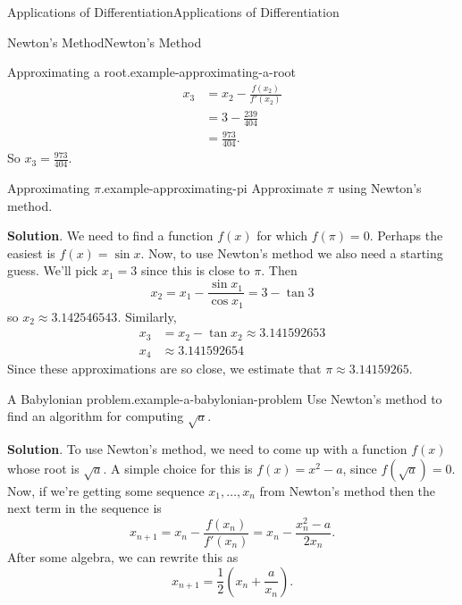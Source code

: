 \documentclass[10pt,]{book}
\numberwithin{equation}{section}
\begin{document}
\begin{chapterptx}{Applications of Differentiation}{}{Applications of Differentiation}{}{}
\begin{sectionptx}{Newton's Method}{}{Newton's Method}{}{}
\begin{example}{Approximating a root.}{example-approximating-a-root}
\begin{align*}
x_{3} & = x_{2} - \frac{f(x_{2})}{f'(x_{2})} \\
& = 3 - \frac{239}{404} \\
& = \frac{973}{404}. 
\end{align*}
So \(x_{3} = \frac{973}{404}.\)%
\end{example}
\begin{example}{Approximating \(\pi\).}{example-approximating-pi}%
\hypertarget{p-371}{}%
Approximate \(\pi\) using Newton's method.%
\par\smallskip%
\noindent\textbf{Solution}.\hypertarget{solution-82}{}\quad%
\hypertarget{p-372}{}%
We need to find a function \(f(x)\) for which \(f(\pi) = 0\). Perhaps the easiest is \(f(x) = \sin x\). Now, to use Newton's method we also need a starting guess. We'll pick \(x_{1} = 3\) since this is close to \(\pi\). Then%
\begin{equation*}
x_{2} = x_{1} - \frac{\sin x_{1}}{\cos x_{1}} = 3 - \tan 3
\end{equation*}
so \(x_{2} \approx 3.142546543\). Similarly,%
\begin{align*}
x_{3} & = x_{2} - \tan x_{2} \approx 3.141592653 \\
x_{4} & \approx 3.141592654 
\end{align*}
Since these approximations are so close, we estimate that \(\pi\approx 3.14159265\).%
\end{example}
\begin{example}{A Babylonian problem.}{example-a-babylonian-problem}%
\hypertarget{p-373}{}%
Use Newton's method to find an algorithm for computing \(\sqrt{a}\).%
\par\smallskip%
\noindent\textbf{Solution}.\hypertarget{solution-83}{}\quad%
\hypertarget{p-374}{}%
To use Newton's method, we need to come up with a function \(f(x)\) whose root is \(\sqrt{a}\). A simple choice for this is \(f(x) = x^{2} - a\), since \(f(\sqrt{a}) = 0\). Now, if we're getting some sequence \(x_{1},\ldots,x_{n}\) from Newton's method then the next term in the sequence is%
\begin{equation*}
x_{n+1} = x_{n} - \frac{f(x_{n})}{f'(x_{n})} = x_{n} - \frac{x_{n}^{2} - a}{2x_{n}}.
\end{equation*}
After some algebra, we can rewrite this as%
\begin{equation*}
x_{n+1} = \frac{1}{2}\left(x_{n} + \frac{a}{x_{n}}\right).
\end{equation*}
%
\par
\hypertarget{p-375}{}%

\end{example}
\end{sectionptx}
\end{chapterptx}
\end{document}
